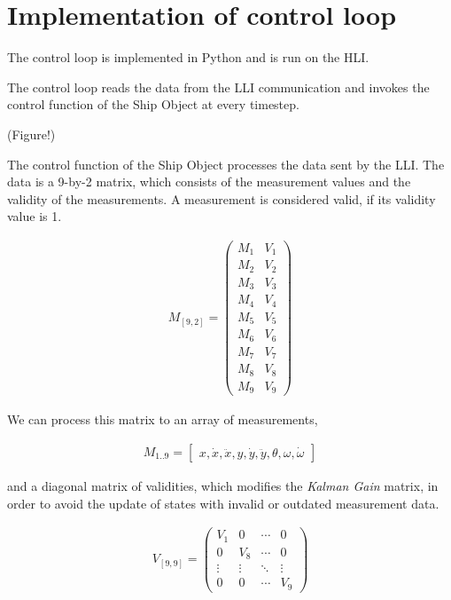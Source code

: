 \section{Implementation of control loop}

The control loop is implemented in Python and is run on the HLI.

The control loop reads the data from the LLI communication and invokes the control function of the Ship Object at every timestep.

(Figure!)

The control function of the Ship Object processes the data sent by the LLI. The data is a 9-by-2 matrix, which consists of the measurement values and the validity of the measurements. A measurement is considered valid, if its validity value is 1.

\begin{align}
M_{[9,2]} =
  \begin{pmatrix}
   M_1 & V_1 \\
   M_2 & V_2 \\
   M_3 & V_3 \\
   M_4 & V_4 \\
   M_5 & V_5 \\
   M_6 & V_6 \\
   M_7 & V_7 \\
   M_8 & V_8 \\
   M_9 & V_9
  \end{pmatrix}
\end{align}

We can process this matrix to an array of measurements,

\begin{align}M_{1..9} = 
	\begin{bmatrix}
	x, \dot{x}, \ddot{x}, y, \dot{y}, \ddot{y}, \theta, \omega, \dot{\omega}
	\end{bmatrix}\end{align}

and a diagonal matrix of validities, which modifies the \emph{Kalman Gain} matrix, in order to avoid the update of states with invalid or outdated measurement data.

\begin{align}
V_{[9,9]} =
  \begin{pmatrix}
   V_1 & 0 & \cdots & 0 \\
   0 & V_8 & \cdots & 0 \\
   \vdots  & \vdots  & \ddots & \vdots  \\
   0 & 0 & \cdots & V_9
  \end{pmatrix}
\end{align}

